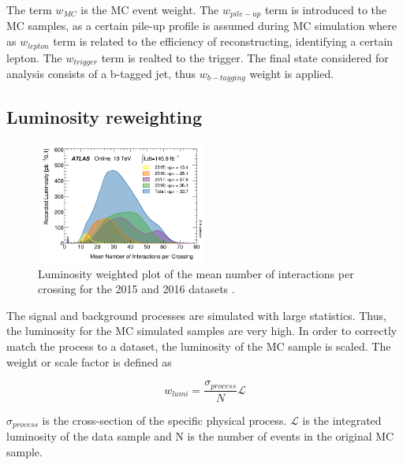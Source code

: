 The term $ w_{MC}$ is the MC event weight. The $ w_{pile-up}$ term is introduced to the MC samples, as a certain pile-up profile is assumed during MC simulation where as  $ w_{lepton}$ term is related to the efficiency of reconstructing, identifying a certain lepton. The $ w_{trigger}$ term is realted to the trigger. The final state considered for analysis consists of a  b-tagged jet, thus   $ w_{b-tagging}$ weight is applied.

\subsection{Luminosity reweighting}
\label{subsec:luminosityreweighting}

\begin{figure}[!h]
\centering
\includegraphics[width=0.5\textwidth]{ubonn-thesis/Chapters/Chapters_04/Figure/mu_2015_2018.png}
\caption{Luminosity weighted plot of the mean number of interactions per crossing for the 2015 and 2016 datasets \cite{ATLAS-CONF-2020-023}.}
\label{}
\end{figure}


The signal and background processes are simulated with large statistics. Thus, the luminosity for the MC simulated samples are very high. In order to correctly match the process to a dataset, the luminosity of the MC sample is scaled. The weight or scale factor is defined as 

\begin{equation}
    \label{luminosity}
    w_{lumi} = \frac{\sigma_{process}}{N} \mathcal{L}
\end{equation}

$\sigma_{process}$ is the cross-section of the specific physical process. $\mathcal{L}$ is the integrated luminosity of the data sample and N is the number of events in the original MC sample.
